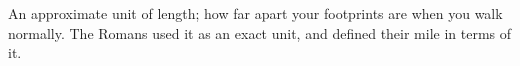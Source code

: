 An approximate unit of length; how far apart your footprints are
when you walk normally. The Romans used it as an exact
unit, and defined their mile in terms of it.